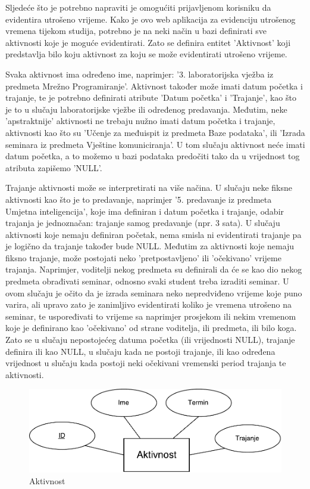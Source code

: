 \documentclass[times, utf8, zavrsni]{fer}
\begin{document}
Sljedeće što je potrebno napraviti je omogućiti prijavljenom korisniku da evidentira utrošeno vrijeme. Kako je ovo web aplikacija za evidenciju utrošenog vremena tijekom studija, potrebno je na neki način u bazi definirati sve aktivnosti koje je moguće evidentirati. Zato se definira entitet 'Aktivnost' koji predstavlja bilo koju aktivnost za koju se može evidentirati utrošeno vrijeme. 

Svaka aktivnost ima određeno ime, naprimjer: '3. laboratorijska vježba iz predmeta Mrežno Programiranje'. Aktivnost također može imati datum početka i trajanje, te je potrebno definirati atribute 'Datum početka' i 'Trajanje', kao što je to u slučaju laboratorijske vježbe ili određenog predavanja. Međutim, neke 'apstraktnije' aktivnosti ne trebaju nužno imati datum početka i trajanje, aktivnosti kao što su 'Učenje za međuispit iz predmeta Baze podataka', ili 'Izrada seminara iz predmeta Vještine komuniciranja'. U tom slučaju aktivnost neće imati datum početka, a to možemo u bazi podataka predočiti tako da u vrijednost tog atributa zapišemo 'NULL'.

Trajanje aktivnosti može se interpretirati na više načina. U slučaju neke fiksne aktivnosti kao što je to predavanje, naprimjer '5. predavanje iz predmeta Umjetna inteligencija', koje ima definiran i datum početka i trajanje, odabir trajanja je jednoznačan: trajanje samog predavanje (npr. 3 sata). U slučaju aktivnosti koje nemaju definiran početak, nema smisla ni evidentirati trajanje pa je logično da trajanje također bude NULL. Međutim za aktivnosti koje nemaju fiksno trajanje, može postojati neko 'pretpostavljeno' ili 'očekivano' vrijeme trajanja. Naprimjer, voditelji nekog predmeta su definirali da će se kao dio nekog predmeta obrađivati seminar, odnosno svaki student treba izraditi seminar. U ovom slučaju je očito da je izrada seminara neko nepredviđeno vrijeme koje puno varira, ali upravo zato je zanimljivo evidentirati koliko je vremena utrošeno na seminar, te uspoređivati to vrijeme sa naprimjer prosjekom ili nekim vremenom koje je definirano kao 'očekivano' od strane voditelja, ili predmeta, ili bilo koga. Zato se u slučaju nepostojećeg datuma početka (ili vrijednosti NULL), trajanje definira ili kao NULL, u slučaju kada ne postoji trajanje, ili kao određena vrijednost u slučaju kada postoji neki očekivani vremenski period trajanja te aktivnosti.\\

\begin{figure}[H]
\centering
\includegraphics[width=\textwidth,height=\textheight,keepaspectratio]{img/aktivnost.pdf}
\caption{Aktivnost}
\label{fig:aktivnost}
\end{figure}
\end{document}
